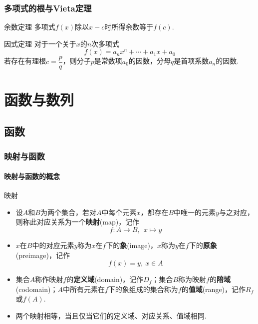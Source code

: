 \documentclass[lang=cn, zihao=5]{elegantbook}
\begin{document}
\section{多项式的根与Vieta定理}

\begin{theorem}{余数定理}
	多项式$f(x)$除以$x-c$时所得余数等于$f(c)$.
\end{theorem}

\begin{theorem}{因式定理}
    对于一个关于$x$的$n$次多项式$$f(x)=a_nx^n+ \cdots +a_1x+a_0$$若存在有理根$c=\dfrac{p}{q}$，则分子$p$是常数项$a_0$的因数，分母$q$是首项系数$a_n$的因数.
\end{theorem}

\part{函数与数列}

\chapter{函数}

\section{映射与函数}

\subsection{映射与函数的概念}

\begin{definition}{映射}
	\begin{itemize}
		\item 设$A$和$B$为两个集合，若对$A$中每个元素$x$，都存在$B$中唯一的元素$y$与之对应，则称此对应关系为一个\textbf{映射}(map)，记作$$f:A \to B,~~x \mapsto y$$
		\item $x$在$B$中的对应元素$y$称为$x$在$f$下的\textbf{象}(image)，$x$称为$y$在$f$下的\textbf{原象}(preimage)，记作$$f(x) = y,~ x \in A$$
		\item 集合$A$称作映射$f$的\textbf{定义域}(domain)，记作$D_f$；集合$B$称为映射$f$的\textbf{陪域}(codomain)；$A$中所有元素在$f$下的象组成的集合称为$f$的\textbf{值域}(range)，记作$R_f$或$f(A)$.
		\item 两个映射相等，当且仅当它们的定义域、对应关系、值域相同.
	\end{itemize}
\end{definition}
\end{document}

